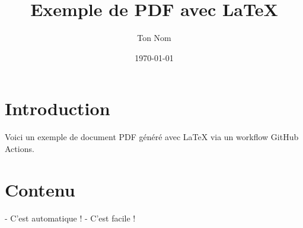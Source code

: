 \documentclass{article}
\title{Exemple de PDF avec LaTeX}
\author{Ton Nom}
\date{\today}
\begin{document}
\maketitle

\section{Introduction}
Voici un exemple de document PDF généré avec LaTeX via un workflow GitHub Actions.

\section{Contenu}
- C'est automatique !
- C'est facile !
\end{document}
